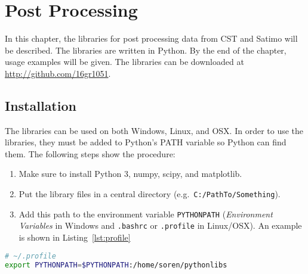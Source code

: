 \chapter{Post Processing}
\label{cha:postproc}

In this chapter, the libraries for post processing data from CST and Satimo will be described. The libraries are written in Python. By the end of the chapter, usage examples will be given. The libraries can be downloaded at \url{http://github.com/16gr1051}.

\section{Installation}
\label{sec:pythoninstall}
The libraries can be used on both Windows, Linux, and OSX. In order to use the libraries, they must be added to Python's PATH variable so Python can find them. The following steps show the procedure:
\begin{enumerate}
\item Make sure to install Python 3, numpy, scipy, and matplotlib.
\item Put the library files in a central directory (e.g.\ \texttt{C:/PathTo/Something}).
\item Add this path to the environment variable \texttt{PYTHONPATH} (\emph{Environment Variables} in Windows and \texttt{.bashrc} or \texttt{.profile} in Linux/OSX). An example is shown in Listing~\ref{lst:profile}
\end{enumerate}
\begin{lstlisting}[caption={Example of a \texttt{.profile} file for Linux, adding a library directory to the Python path.}, label=lst:profile, language=sh]
# ~/.profile
export PYTHONPATH=$PYTHONPATH:/home/soren/pythonlibs
\end{lstlisting}

